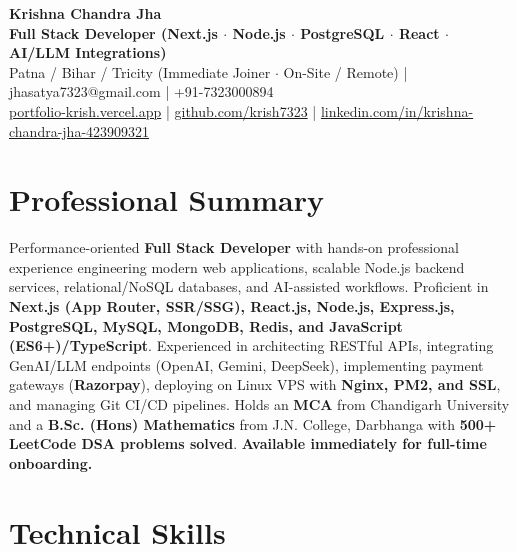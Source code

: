 \documentclass[a4paper,10pt]{article}
\begin{document}
\begin{center}

    {\LARGE \textbf{Krishna Chandra Jha}} \\[2.5pt]

    \textbf{Full Stack Developer (Next.js $\cdot$ Node.js $\cdot$ PostgreSQL $\cdot$ React $\cdot$ AI/LLM Integrations)} \\[3.5pt]

    Patna / Bihar / Tricity (Immediate Joiner $\cdot$ On-Site / Remote)
    \quad | \quad
    jhasatya7323@gmail.com
    \quad | \quad
    +91-7323000894
    \\[2.5pt]

    \href{https://portfolio-ashen-alpha-dv0whhsamo.vercel.app/}{portfolio-krish.vercel.app}
    \quad | \quad
    \href{https://github.com/krish7323}{github.com/krish7323}
    \quad | \quad
    \href{https://linkedin.com/in/krishna-chandra-jha-423909321}
    {linkedin.com/in/krishna-chandra-jha-423909321}

\end{center}

\section*{Professional Summary}

Performance-oriented \textbf{Full Stack Developer} with hands-on professional experience engineering modern web applications, scalable Node.js backend services, relational/NoSQL databases, and AI-assisted workflows. Proficient in \textbf{Next.js (App Router, SSR/SSG), React.js, Node.js, Express.js, PostgreSQL, MySQL, MongoDB, Redis, and JavaScript (ES6+)/TypeScript}. Experienced in architecting RESTful APIs, integrating GenAI/LLM endpoints (OpenAI, Gemini, DeepSeek), implementing payment gateways (\textbf{Razorpay}), deploying on Linux VPS with \textbf{Nginx, PM2, and SSL}, and managing Git CI/CD pipelines. Holds an \textbf{MCA} from Chandigarh University and a \textbf{B.Sc. (Hons) Mathematics} from J.N. College, Darbhanga with \textbf{500+ LeetCode DSA problems solved}. \textbf{Available immediately for full-time onboarding.}

\section*{Technical Skills}
\end{document}

